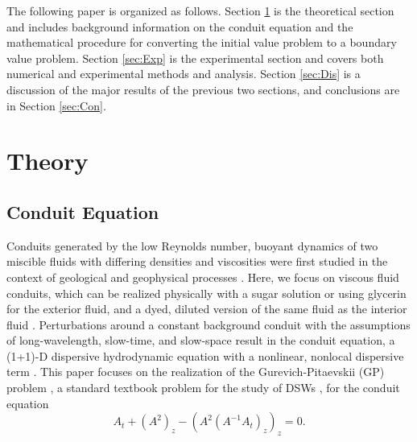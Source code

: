 \documentclass{jfm}
\begin{document}
The following paper is organized as follows. Section \ref{sec:Theory} is the theoretical section and includes background information on the conduit equation and the mathematical procedure for converting the initial value problem to a boundary value problem. Section \ref{sec:Exp} is the experimental section and covers both numerical and experimental methods and analysis. Section \ref{sec:Dis} is a discussion of the major results of the previous two sections, and conclusions are in Section \ref{sec:Con}.

\section{Theory}\label{sec:Theory}
\subsection{Conduit Equation}
Conduits generated by the low Reynolds number, buoyant dynamics of two miscible fluids with differing densities and viscosities were first studied in the context of geological and geophysical processes \cite{whitehead_dynamics_1975}. 
Here, we focus on viscous fluid conduits, which can be realized physically with a sugar solution or using glycerin for the exterior fluid, and a dyed, diluted version of the same fluid as the interior fluid \cite{olson_solitary_1986,scott_observations_1986,whitehead_wave_1988,maiden_observation_2016}.
Perturbations around a constant background conduit with the assumptions of long-wavelength, slow-time, and slow-space result in the conduit equation, a (1+1)-D dispersive hydrodynamic equation with a nonlinear, nonlocal dispersive term \cite{lowman_dispersive_2013}.
This paper focuses on the realization of the Gurevich-Pitaevskii (GP) problem \cite{gurevich_nonstationary_1974}, a standard textbook problem for the study of DSWs \cite{el_dispersive_2016}, for the conduit equation
\begin{equation}\label{eq:conduit}
  A_t + (A^2)_z -(A^2(A^{-1}A_t)_z)_z = 0.
\end{equation}
\end{document}
